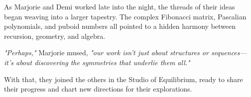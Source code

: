 As Marjorie and Demi worked late into the night, the threads of their ideas began weaving into a larger tapestry. The complex Fibonacci matrix, Pascalian polynomials, and puboid numbers all pointed to a hidden harmony between recursion, geometry, and algebra.

\emph{"Perhaps,"} Marjorie mused, \emph{"our work isn’t just about structures or sequences—it’s about discovering the symmetries that underlie them all."}

With that, they joined the others in the Studio of Equilibrium, ready to share their progress and chart new directions for their explorations.


